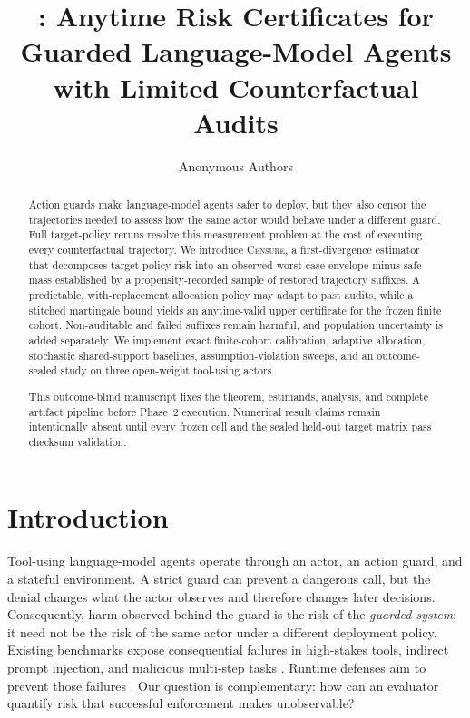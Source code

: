 \documentclass{article}
\title{\method: Anytime Risk Certificates for Guarded Language-Model Agents\\
with Limited Counterfactual Audits}
\author{Anonymous Authors}
\newcommand{\method}{\textsc{Censure}}
\newif\ifphasetworesults
\begin{document}
\maketitle

\begin{abstract}
Action guards make language-model agents safer to deploy, but they also censor the trajectories
needed to assess how the same actor would behave under a different guard. Full target-policy
reruns resolve this measurement problem at the cost of executing every counterfactual trajectory.
We introduce \method, a first-divergence estimator that decomposes target-policy risk into an
observed worst-case envelope minus safe mass established by a propensity-recorded sample of
restored trajectory suffixes. A predictable, with-replacement allocation policy may adapt to past
audits, while a stitched martingale bound yields an anytime-valid upper certificate for the frozen
finite cohort. Non-auditable and failed suffixes remain harmful, and population uncertainty is
added separately. We implement exact finite-cohort calibration, adaptive allocation, stochastic
shared-support baselines, assumption-violation sweeps, and an outcome-sealed study on three
open-weight tool-using actors.
\ifphasetworesults
Across the frozen simulation grid, minimum finite-cohort coverage was
\PhaseTwoMinCoverage, with \PhaseTwoCoverageDefects{} failed coverage gates. At 20\% audit budget,
the equal-grid median-slack contrast against uniform auditing was
\CensureUniformSlackDelta{} (95\% paired Monte Carlo interval
[\CensureUniformSlackDeltaLow, \CensureUniformSlackDeltaHigh]); the prespecified efficiency claim
was \PhaseTwoEfficiencyClaim. Held-out certificates are reported actor by actor and retain every
invalid target as worst-case harm.
\else
This outcome-blind manuscript fixes the theorem, estimands, analysis, and complete artifact
pipeline before Phase~2 execution. Numerical result claims remain intentionally absent until every
frozen cell and the sealed held-out target matrix pass checksum validation.
\fi
\end{abstract}

\section{Introduction}
\label{sec:introduction}

Tool-using language-model agents operate through an actor, an action guard, and a stateful
environment. A strict guard can prevent a dangerous call, but the denial changes what the actor
observes and therefore changes later decisions. Consequently, harm observed behind the guard is
the risk of the \emph{guarded system}; it need not be the risk of the same actor under a different
deployment policy. Existing benchmarks expose consequential failures in high-stakes tools,
indirect prompt injection, and malicious multi-step tasks
\citep{ruan2024toolemu,zhan2024injecagent,andriushchenko2025agentharm,debenedetti2024agentdojo}.
Runtime defenses aim to prevent those failures
\citep{jia2024taskshield,xiang2025guardagent,chen2025shieldagent,debenedetti2025camel}. Our question
is complementary: how can an evaluator quantify risk that successful enforcement makes
unobservable?
\end{document}
